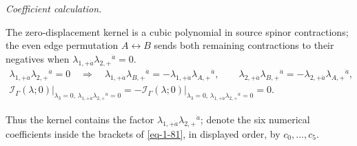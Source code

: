 \documentclass[11pt]{article}
\numberwithin{equation}{section}
\numberwithin{figure}{section}
\numberwithin{table}{section}
\begin{document}
\begin{proofbox}
\emph{Coefficient calculation.}

The zero-displacement kernel is a cubic polynomial in source spinor contractions; the even edge permutation $A\leftrightarrow B$ sends both remaining contractions to their negatives when $\lambda_{1,+\dot a}\lambda_{2,+}{}^{\dot a}=0$.
\begin{equation*}
\begin{gathered}
\lambda_{1,+\dot a}\lambda_{2,+}{}^{\dot a}=0
\quad\Longrightarrow\quad
\lambda_{1,+\dot a}\lambda_{B,+}{}^{\dot a}
=-\lambda_{1,+\dot a}\lambda_{A,+}{}^{\dot a},\qquad
\lambda_{2,+\dot a}\lambda_{B,+}{}^{\dot a}
=-\lambda_{2,+\dot a}\lambda_{A,+}{}^{\dot a},\\
\left.\mathcal I_\Gamma(\lambda;0)\right|_{\lambda_3=0,\,\lambda_{1,+\dot a}\lambda_{2,+}{}^{\dot a}=0}
=-\left.\mathcal I_\Gamma(\lambda;0)\right|_{\lambda_3=0,\,\lambda_{1,+\dot a}\lambda_{2,+}{}^{\dot a}=0}=0.
\end{gathered}
\end{equation*}

Thus the kernel contains the factor $\lambda_{1,+\dot a}\lambda_{2,+}{}^{\dot a}$; denote the six numerical coefficients inside the brackets of \eqref{eq-1-81}, in displayed order, by $c_0,\ldots,c_5$.


\end{proofbox}
\end{document}

